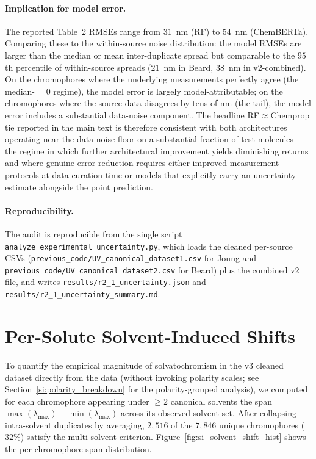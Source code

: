 \documentclass[journal=jcisd8,manuscript=suppinfo]{achemso}
\begin{document}
\paragraph{Implication for model error.}
The reported Table~2 RMSEs range from $31$~nm (RF) to $54$~nm (ChemBERTa). Comparing these to the within-source noise distribution: the model RMSEs are larger than the median or mean inter-duplicate spread but comparable to the $95$th percentile of within-source spreads ($21$~nm in Beard, $38$~nm in v2-combined). On the chromophores where the underlying measurements perfectly agree (the median-$=0$ regime), the model error is largely model-attributable; on the chromophores where the source data disagrees by tens of nm (the tail), the model error includes a substantial data-noise component. The headline RF$\approx$Chemprop tie reported in the main text is therefore consistent with both architectures operating near the data noise floor on a substantial fraction of test molecules---the regime in which further architectural improvement yields diminishing returns and where genuine error reduction requires either improved measurement protocols at data-curation time or models that explicitly carry an uncertainty estimate alongside the point prediction.

\paragraph{Reproducibility.}
The audit is reproducible from the single script \texttt{analyze\_experimental\_uncertainty.py}, which loads the cleaned per-source CSVs (\texttt{previous\_code/UV\_canonical\_dataset1.csv} for Joung and \texttt{previous\_code/UV\_canonical\_dataset2.csv} for Beard) plus the combined v2 file, and writes \texttt{results/r2\_1\_uncertainty.json} and \texttt{results/r2\_1\_uncertainty\_summary.md}.


\section{Per-Solute Solvent-Induced Shifts}
\label{si:solvent_shifts}

To quantify the empirical magnitude of solvatochromism in the v3 cleaned dataset directly from the data (without invoking polarity scales; see Section~\ref{si:polarity_breakdown} for the polarity-grouped analysis), we computed for each chromophore appearing under $\geq 2$ canonical solvents the span $\max(\lambda_{\max}) - \min(\lambda_{\max})$ across its observed solvent set. After collapsing intra-solvent duplicates by averaging, $2{,}516$ of the $7{,}846$ unique chromophores ($32$\%) satisfy the multi-solvent criterion. Figure~\ref{fig:si_solvent_shift_hist} shows the per-chromophore span distribution.
\end{document}
